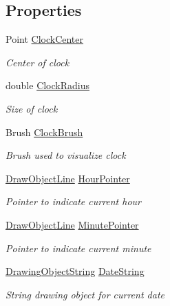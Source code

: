 \subsection*{Properties}
\begin{DoxyCompactItemize}
\item 
Point \hyperlink{class_w_p_f_visualization_base_1_1_draw_analog_clock_with_date_abfcb9a2da12ae274e84221ab7eab52de}{Clock\+Center}
\begin{DoxyCompactList}\small\item\em Center of clock \end{DoxyCompactList}\item 
double \hyperlink{class_w_p_f_visualization_base_1_1_draw_analog_clock_with_date_a5103246fd066cf02a8076140e1546def}{Clock\+Radius}
\begin{DoxyCompactList}\small\item\em Size of clock \end{DoxyCompactList}\item 
Brush \hyperlink{class_w_p_f_visualization_base_1_1_draw_analog_clock_with_date_aaa2561134d996d38fa087f18410eaff0}{Clock\+Brush}
\begin{DoxyCompactList}\small\item\em Brush used to visualize clock \end{DoxyCompactList}\item 
\hyperlink{class_w_p_f_visualization_base_1_1_draw_object_line}{Draw\+Object\+Line} \hyperlink{class_w_p_f_visualization_base_1_1_draw_analog_clock_with_date_a3e46eed172aeea22d919fc0119537088}{Hour\+Pointer}
\begin{DoxyCompactList}\small\item\em Pointer to indicate current hour \end{DoxyCompactList}\item 
\hyperlink{class_w_p_f_visualization_base_1_1_draw_object_line}{Draw\+Object\+Line} \hyperlink{class_w_p_f_visualization_base_1_1_draw_analog_clock_with_date_a746828f3b40ca1f1289e5cc5cffa2053}{Minute\+Pointer}
\begin{DoxyCompactList}\small\item\em Pointer to indicate current minute \end{DoxyCompactList}\item 
\hyperlink{class_w_p_f_visualization_base_1_1_drawing_object_string}{Drawing\+Object\+String} \hyperlink{class_w_p_f_visualization_base_1_1_draw_analog_clock_with_date_a38dd55ea65aa6cccf5ad500ca96a48de}{Date\+String}
\begin{DoxyCompactList}\small\item\em String drawing object for current date \end{DoxyCompactList}\end{DoxyCompactItemize}
